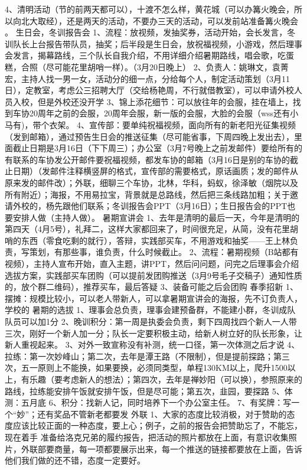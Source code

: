 \documentclass{ctexbook}
\begin{document}
4、清明活动（节的前两天都可以），十渡不怎么样，黄花城（可以办篝火晚会，所以向北大取经），还是两天的活动，不要办三天的活动，可以发前站准备篝火晚会 。
生日会，冬训报告会
1、流程：放视频，发抽奖券，活动开始，会长发言，冬训队长上台报告带队员，抽奖；后半段是生日会，放祝福视频，小游戏，然后理事会发言，揭幕路线，三个队长自我介绍，不用详细介绍暑期路线，唱会歌，吃蛋糕，合照（尽可能花里胡哨一样）。（3月20日晚上）
2、负责人：姚琳文，袁菁宏，主持人找一男一女，活动分的细一点，分给每个人，制定活动策划（3月11日），定教室，考虑公三招聘大厅（交给杨艳周，不行就借教室），可以申请外校人员入校，但是外校还没开学
3、锦上添花细节：可以放往年的会服，挂在墙上，找到车协20周年之前的会服，20周年会服，新一版的会服，大脸的会服（wss还有小马有)，带个衣架。
4、宣传部：要单纯祝福视频，面向所有的新老阳光征集视频（发到邮箱），通过预告生日会的推送征集（尽可能省事，下周四晚上发出去），里面截止日期是3月16日（下下周三）；办公室（3月7号晚上之前发邮件）要给所有的有联系的车协发公开邮件要祝福视频，都发车协的邮箱（3月16日是别的车协的截止日期）（发邮件注释横竖屏的格式，宣传部的需要格式，原话画质；发的邮件从原来发的邮件改）；外联，细聊三个车协，北林，华科，蚂蚁，徐泽敏（烟院以及所有附近）；海报，不用易拉宝，背景就是总路线，然后把三条线路加粗；关于邀请外校的，杨先跟他们联系；冬训报告会PPT（3月16日）；生日报告会的PPT也要安排人做（主持人做）。
暑期宣讲会
1、去年是清明的最后一天，今年是清明的第四天（4月5号），礼拜二，这样大家都回来了，时间很充足，从简，没有花里胡哨的东西（零食吃剩的就行），答辩，实践部买车，不用游戏和抽奖——王上林负责，写策划，有那些事，谁负责，什么时候截止。
2、流程：暑期视频（B站都有视频），主持人宣布开始，直入主题，讲PPT，然后问问题，问完之后理事会介绍选拔方案，实践部买车团购（可以提前发团购推送（3月9号毛子交稿子）通知性质的，放个群二维码），推荐买车，最后答疑
3、装备可能之后会团购
春季招新
1、摆摊：规模比较小，可以老人带新人，可以拿暑期宣讲会的海报，先不订负责人，学校的
暑期的选拔
1、理事会总负责，理事会建预备群，不能建小群，冬训成队队员可以加1分
2、晚训积分：第一周是执委会负责，剩下四周找四个新人一人带三次，刚好一个新人加一分；队长一定要积极主动，给新人树立好的队长形象，让新人重视起来。
3、对外一致宣称没有补测，统一口径，第一次体测之后才说
4、拉练：第一次妙峰山；第二次，去年是潭王路（不限制），但是提前探路；第三次，五一原则上不能换，如果要换，必须同类型，单程130KM以上，爬升1500以上，有乐趣（要考虑新人的想法）；第四次，去年是禅妙阳（可以换），参照原来的路线，拉练能安排午饭就安排午饭，但是尽可能；第五次，韭园，要探路
5、体测：五月底
6、积分：找新人记，同时培养下一个办公室主任。
7、有奖牌：写一个“妙”；还有奖品不管新老都要发
外联
1、大家的态度比较消极，对于赞助的态度应该比较正面的一种态度，要上心；例子，之前的报告会把赞助忘了，不能忘，现在着手 准备给洛克兄弟的履约报告，把活动的照片都放在上面，有意识收集照片，外联部要商量，每一项都要展示出来，每一个推送的链接都要放在上面，告诉他们我们做的还不错，态度一定要好。
\end{document}
